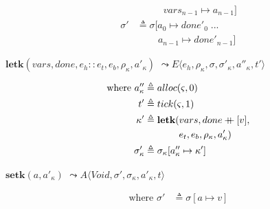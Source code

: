 \documentclass[12pt,draft]{article}
\newcommand\mdoubleplus{\ensuremath{\mathbin{+\mkern-9mu+}}}
\begin{document}
\begin{multicols*}{2}
\begin{align*}
                    &\;\;\;\;\;\;\;\;\;\;  vars_{n-1} \mapsto a_{n-1}] \\
  \sigma' &\triangleq \sigma[a_0 \mapsto done'_0\;...\\
                    &\;\;\;\;\;\;\;\;a_{n-1} \mapsto done'_{n-1}]
\end{align*}
\begin{center}
  $\textbf{letk}(vars, done, e_h::e_t , e_b , \rho_\kappa, a'_\kappa)$
  $\leadsto E\langle e_h , \rho_\kappa , \sigma , \sigma'_\kappa , a''_\kappa , t' \rangle$
\end{center}
\vspace{-7mm}
\begin{align*}
  \text{where }
  a''_\kappa &\triangleq alloc(\varsigma, 0) \\
  t' &\triangleq tick(\varsigma, 1) \\
  \kappa' &\triangleq \textbf{letk}(vars, done \mdoubleplus [v], \\
             &\;\;\;\;\;\;\;\;\;\;\;\;\;e_t, e_b, \rho_\kappa, a'_\kappa) \\
  \sigma'_\kappa &\triangleq \sigma_\kappa[a''_\kappa \mapsto \kappa']
\end{align*}
\begin{center}
  $\textbf{setk}(a, a'_\kappa)$
  $\leadsto A\langle \textit{Void} , \sigma' , \sigma_\kappa , a'_\kappa , t \rangle$
\end{center}
\vspace{-7mm}
\begin{align*}
  \text{where } \sigma' &\triangleq \sigma[a \mapsto v]
\end{align*}

\vfill\null
\columnbreak



\end{multicols*}
\end{document}
